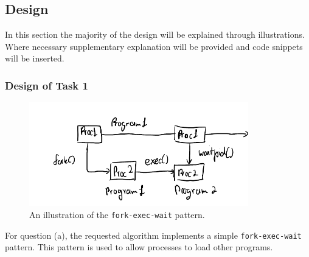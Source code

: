 \documentclass[12pt]{article}
\begin{document}
\begin{center}
\begin{minipage}[t]{0.3\textwidth}
\end{minipage}
\begin{minipage}[t]{0.3\textwidth}
\end{minipage}
\begin{minipage}[t]{0.3\textwidth}
\end{minipage}
\end{center}

\subsection{Design}

In this section the majority of the design will be explained
through illustrations. Where necessary supplementary explanation
will be provided and code snippets will be inserted.

\subsubsection{Design of Task 1}

\begin{figure}[H]
\centering
\includegraphics[height=4.5cm]{task1qa}
\caption{An illustration of the \texttt{fork-exec-wait} pattern.}
\end{figure}



For question (a), the requested algorithm implements a simple
\texttt{fork-exec-wait} pattern. This pattern is used to allow
processes to load other programs.
\end{document}

